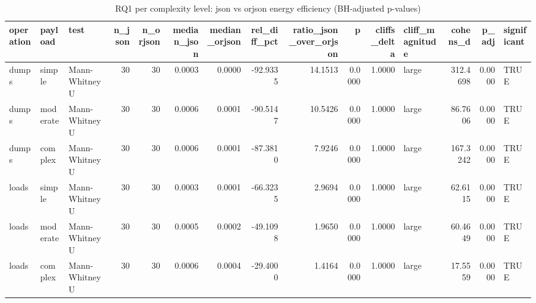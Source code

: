 \begin{table}[ht]
\centering
\begin{tabular}{lllrrrrrrrrlrrl}
  \toprule
operation & payload & test & n\_json & n\_orjson & median\_json & median\_orjson & rel\_diff\_pct & ratio\_json\_over\_orjson & p & cliffs\_delta & cliff\_magnitude & cohens\_d & p\_adj & significant \\ 
  \midrule
dumps & simple & Mann-Whitney U &    30 &    30 & 0.0003 & 0.0000 & -92.9335 & 14.1513 & 0.0000 & 1.0000 & large & 312.4698 & 0.0000 & TRUE \\ 
  dumps & moderate & Mann-Whitney U &    30 &    30 & 0.0006 & 0.0001 & -90.5147 & 10.5426 & 0.0000 & 1.0000 & large & 86.7606 & 0.0000 & TRUE \\ 
  dumps & complex & Mann-Whitney U &    30 &    30 & 0.0006 & 0.0001 & -87.3810 & 7.9246 & 0.0000 & 1.0000 & large & 167.3242 & 0.0000 & TRUE \\ 
  loads & simple & Mann-Whitney U &    30 &    30 & 0.0003 & 0.0001 & -66.3235 & 2.9694 & 0.0000 & 1.0000 & large & 62.6115 & 0.0000 & TRUE \\ 
  loads & moderate & Mann-Whitney U &    30 &    30 & 0.0005 & 0.0002 & -49.1098 & 1.9650 & 0.0000 & 1.0000 & large & 60.4649 & 0.0000 & TRUE \\ 
  loads & complex & Mann-Whitney U &    30 &    30 & 0.0006 & 0.0004 & -29.4000 & 1.4164 & 0.0000 & 1.0000 & large & 17.5559 & 0.0000 & TRUE \\ 
   \bottomrule
\end{tabular}
\caption{RQ1 per complexity level: json vs orjson energy efficiency (BH-adjusted p-values)} 
\label{tab:rq1_pairwise}
\end{table}
